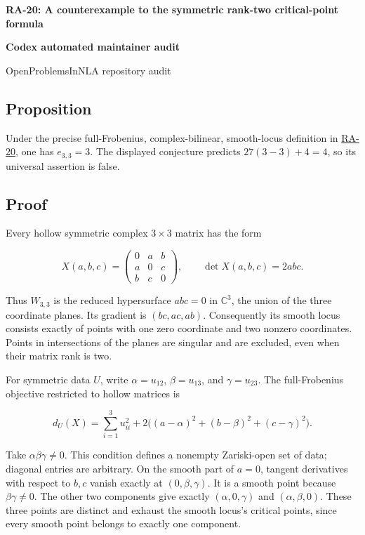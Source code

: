 \documentclass[10pt,a4paper]{article}
\begin{document}
{\raggedright\Large\bfseries RA-20: A counterexample to the symmetric
rank-two critical-point formula\par}
\vspace{0.4em}
{\normalsize\bfseries Codex automated maintainer audit\par}
{\small OpenProblemsInNLA repository audit\par}
\vspace{0.6em}
\subsection{Proposition}\label{proposition}

Under the precise full-Frobenius, complex-bilinear, smooth-locus
definition in
\href{https://github.com/ajt60gaibb/OpenProblemsInNLA/blob/main/randomized-and-low-rank-approximation/RA-20/README.md}{RA-20},
one has \(e_{3,3}=3\). The displayed conjecture predicts
\(27(3-3)+4=4\), so its universal assertion is false.

\subsection{Proof}\label{proof}

Every hollow symmetric complex \(3\times3\) matrix has the form

\[
X(a,b,c)=\begin{pmatrix}0&a&b\\a&0&c\\b&c&0\end{pmatrix},
\qquad \det X(a,b,c)=2abc.
\]

Thus \(W_{3,3}\) is the reduced hypersurface \(abc=0\) in
\(\mathbb C^3\), the union of the three coordinate planes. Its gradient
is \((bc,ac,ab)\). Consequently its smooth locus consists exactly of
points with one zero coordinate and two nonzero coordinates. Points in
intersections of the planes are singular and are excluded, even when
their matrix rank is two.

For symmetric data \(U\), write \(\alpha=u_{12}\), \(\beta=u_{13}\), and
\(\gamma=u_{23}\). The full-Frobenius objective restricted to hollow
matrices is

\[
d_U(X)=\sum_{i=1}^3u_{ii}^2+
2\bigl((a-\alpha)^2+(b-\beta)^2+(c-\gamma)^2\bigr).
\]

Take \(\alpha\beta\gamma\ne0\). This condition defines a nonempty
Zariski-open set of data; diagonal entries are arbitrary. On the smooth
part of \(a=0\), tangent derivatives with respect to \(b,c\) vanish
exactly at \((0,\beta,\gamma)\). It is a smooth point because
\(\beta\gamma\ne0\). The other two components give exactly
\((\alpha,0,\gamma)\) and \((\alpha,\beta,0)\). These three points are
distinct and exhaust the smooth locus's critical points, since every
smooth point belongs to exactly one component.
\end{document}

